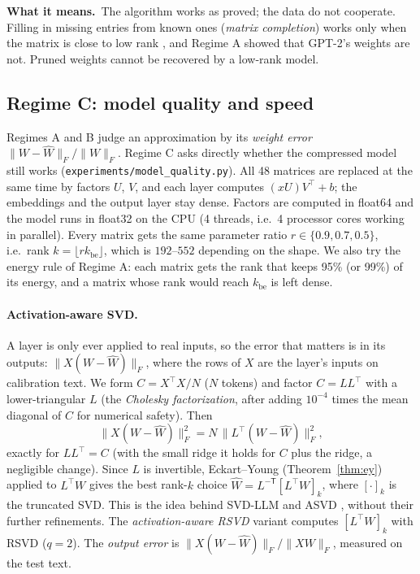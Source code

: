 \documentclass[10pt]{article}
\theoremstyle{plain}
\theoremstyle{definition}
\theoremstyle{remark}
\newcommand{\T}{^{\top}}
\newcommand{\fro}[1]{\lVert #1\rVert_F}
\newcommand{\kbe}{k_{\mathrm{be}}}
\newcommand{\means}{\noindent\textbf{What it means.}\ }
\begin{document}
\means The algorithm works as proved; the data do not cooperate. Filling in missing entries from known ones (\emph{matrix completion}) works only when the matrix is close to low rank \cite{jain2013}, and Regime A showed that GPT-2's weights are not. Pruned weights cannot be recovered by a low-rank model.

\subsection{Regime C: model quality and speed}
\label{sec:quality}

Regimes A and B judge an approximation by its \emph{weight error} $\fro{W-\hat W}/\fro W$. Regime C asks directly whether the compressed model still works (\texttt{experiments/model\_quality.py}). All 48 matrices are replaced at the same time by factors $U$, $V$, and each layer computes $(xU)V\T+b$; the embeddings and the output layer stay dense. Factors are computed in float64 and the model runs in float32 on the CPU (4 threads, i.e.\ 4 processor cores working in parallel). Every matrix gets the same parameter ratio $r\in\{0.9,0.7,0.5\}$, i.e.\ rank $k=\lfloor r\kbe\rfloor$, which is $192$--$552$ depending on the shape. We also try the energy rule of Regime A: each matrix gets the rank that keeps 95\% (or 99\%) of its energy, and a matrix whose rank would reach $\kbe$ is left dense.

\paragraph{Activation-aware SVD.}
A layer is only ever applied to real inputs, so the error that matters is in its outputs: $\fro{X(W-\hat W)}$, where the rows of $X$ are the layer's inputs on calibration text. We form $C=X\T X/N$ ($N$ tokens) and factor $C=LL\T$ with a lower-triangular $L$ (the \emph{Cholesky factorization}, after adding $10^{-4}$ times the mean diagonal of $C$ for numerical safety). Then
\[
\fro{X(W-\hat W)}^2=N\,\fro{L\T(W-\hat W)}^2 ,
\]
exactly for $LL\T=C$ (with the small ridge it holds for $C$ plus the ridge, a negligible change). Since $L$ is invertible, Eckart--Young (Theorem~\ref{thm:ey}) applied to $L\T W$ gives the best rank-$k$ choice $\hat W=L^{-\mathsf T}[L\T W]_k$, where $[\cdot]_k$ is the truncated SVD. This is the idea behind SVD-LLM \cite{wang2025svdllm} and ASVD \cite{yuan2023asvd}, without their further refinements. The \emph{activation-aware RSVD} variant computes $[L\T W]_k$ with RSVD ($q=2$). The \emph{output error} is $\fro{X(W-\hat W)}/\fro{XW}$, measured on the test text.
\end{document}
